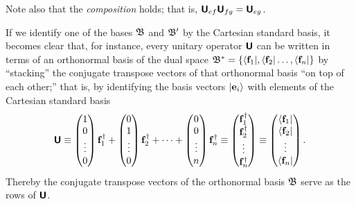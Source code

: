 Note also that the {\em composition} holds; that is, $\textsf{\textbf{U}}_{ef} \textsf{\textbf{U}}_{fg}=  \textsf{\textbf{U}}_{eg}$.


If we
identify one of the bases  ${\frak B}$ and ${\frak B}'$ by the Cartesian standard basis,
it becomes clear that, for instance,
every unitary operator  $\textsf{\textbf{U}}$  can be written in terms of an orthonormal basis  of the dual space
${\frak B}^\ast=\{ \langle {\bf f}_1  \vert     ,   \langle {\bf f}_2  \vert      \ldots ,  \langle {\bf f}_n  \vert     \}$
by ``stacking'' the conjugate transpose vectors of that orthonormal basis ``on top of each other;''
that is, by identifying the basis vectors $\vert {\bf e}_i  \rangle $ with elements of the Cartesian standard basis
\begin{equation}
\textsf{\textbf{U}}
\equiv
\begin{pmatrix}
1\\
0\\
\vdots\\
0
\end{pmatrix} {\bf f}_1^\dagger
+
\begin{pmatrix}
0\\
1\\
\vdots\\
0
\end{pmatrix} {\bf f}_2^\dagger
+
\cdots +
\begin{pmatrix}
0\\
0\\
\vdots\\
n
\end{pmatrix} {\bf f}_n^\dagger
\equiv
\begin{pmatrix}
{\bf f}_1^\dagger\\
{\bf f}_2^\dagger\\
\vdots\\
{\bf f}_n^\dagger
\end{pmatrix}
\equiv
\begin{pmatrix}
\langle {\bf f}_1\vert \\
\langle {\bf f}_2\vert\\
\vdots\\
\langle {\bf f}_n\vert
\end{pmatrix}
.
\end{equation}
Thereby the conjugate transpose vectors of the orthonormal basis  ${\frak B}$ serve as the
rows of $\textsf{\textbf{U}}$.

